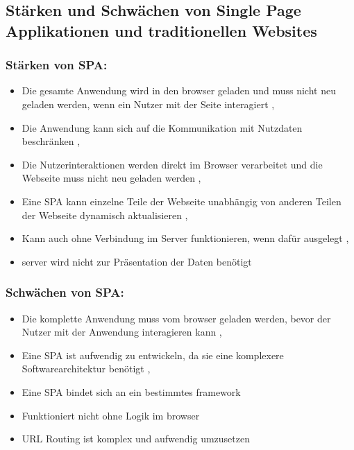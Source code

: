 \subsection{Stärken und Schwächen von Single Page Applikationen und traditionellen Websites}

\subsubsection*{Stärken von \ac{SPA}:}
\begin{itemize}
  \item Die gesamte Anwendung wird in den \gls{browser} geladen und muss nicht neu geladen werden, wenn ein Nutzer mit der Seite interagiert \cite{Smith2022}, \cite{Flanagan2011}
  \item Die Anwendung kann sich auf die Kommunikation mit Nutzdaten beschränken \cite{Smith2022}, \cite{Flanagan2011}
  \item Die Nutzerinteraktionen werden direkt im Browser verarbeitet und die Webseite muss nicht neu geladen werden \cite{Smith2022}, \cite{Flanagan2011}
  \item Eine \ac{SPA} kann einzelne Teile der Webseite unabhängig von anderen Teilen der Webseite dynamisch aktualisieren \cite{Smith2022}, \cite{Irudayaraj2019}
  \item Kann auch ohne Verbindung im Server funktionieren, wenn dafür ausgelegt \cite{Smith2022}, \cite{Gavrila2019}
  \item \gls{server} wird nicht zur Präsentation der Daten benötigt \cite{Flanagan2011}
\end{itemize}


\subsubsection*{Schwächen von \ac{SPA}:}

\begin{itemize}
  \item Die komplette Anwendung muss vom \gls{browser} geladen werden, bevor der Nutzer mit der Anwendung interagieren kann \cite{Smith2022}, \cite{Gavrila2019}
  \item Eine \ac{SPA} ist aufwendig zu entwickeln, da sie eine komplexere Softwarearchitektur benötigt \cite{Smith2022}, \cite{Flanagan2011}
  \item Eine \ac{SPA} bindet sich an ein bestimmtes \gls{framework} \cite{Smith2022}
  \item Funktioniert nicht ohne Logik im \gls{browser} \cite{Smith2022}
  \item \ac{URL} Routing ist komplex und aufwendig umzusetzen \cite{Smith2022}
\end{itemize}

